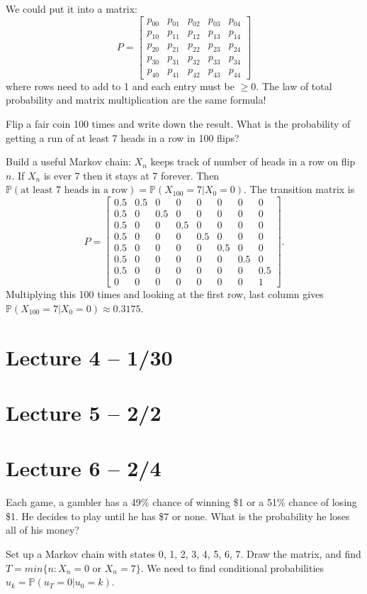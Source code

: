 \documentclass{article}
\newcommand{\PP}{\mathbb{P}}
\begin{document}
We could put it into a matrix:
\[
  P =
  \begin{bmatrix}
    p_{00} & p_{01} & p_{02} & p_{03} & p_{04} \\
    p_{10} & p_{11} & p_{12} & p_{13} & p_{14} \\
    p_{20} & p_{21} & p_{22} & p_{23} & p_{24} \\
    p_{30} & p_{31} & p_{32} & p_{33} & p_{34} \\
    p_{40} & p_{41} & p_{42} & p_{43} & p_{44}
  \end{bmatrix}
\]
where rows need to add to 1 and each entry must be $\geq 0$. The law of total probability and matrix multiplication are the same formula!

\begin{example}
  Flip a fair coin 100 times and write down the result. What is the probability of getting a run of at least 7 heads in a row in 100 flips?

  Build a useful Markov chain: $X_n$ keeps track of number of heads in a row on flip $n$. If $X_n$ is ever 7 then it stays at 7 forever. Then $\PP(\text{at least 7 heads in a row}) = \PP(X_{100}=7|X_0=0)$. The transition matrix is
  \[P =
    \begin{bmatrix}
      0.5 & 0.5 & 0 & 0 & 0 & 0 & 0 & 0 \\
      0.5 & 0 & 0.5 & 0 & 0 & 0 & 0 & 0 \\
      0.5 & 0 & 0 & 0.5 & 0 & 0 & 0 & 0 \\
      0.5 & 0 & 0 & 0 & 0.5 & 0 & 0 & 0 \\
      0.5 & 0 & 0 & 0 & 0 & 0.5 & 0 & 0 \\
      0.5 & 0 & 0 & 0 & 0 & 0 & 0.5 & 0 \\
      0.5 & 0 & 0 & 0 & 0 & 0 & 0 & 0.5 \\
      0 & 0 & 0 & 0 & 0 & 0 & 0 & 1
  \end{bmatrix}.\]
  Multiplying this 100 times and looking at the first row, last column gives $\PP(X_{100}=7|X_0=0) \approx 0.3175.$
\end{example}

\section{Lecture 4 -- 1/30}

\section{Lecture 5 -- 2/2}

\section{Lecture 6 -- 2/4}
\begin{example}
  Each game, a gambler has a 49\% chance of winning \$1 or a 51\% chance of losing \$1. He decides to play until he has \$7 or none. What is the probability he loses all of his money?

  Set up a Markov chain with states 0, 1, 2, 3, 4, 5, 6, 7. Draw the matrix, and find $T=min\{n:X_n=0\text{ or }X_n=7\}$. We need to find conditional probabilities $u_k=\PP(u_T=0|u_0=k).$
\end{example}
\end{document}
